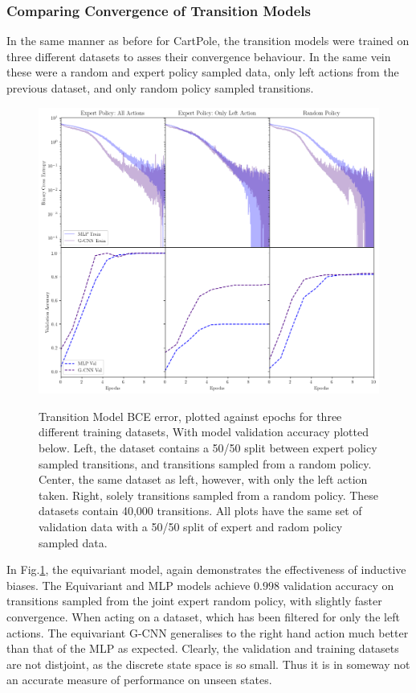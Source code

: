 \subsubsection{Comparing Convergence of Transition Models}
In the same manner as before for CartPole, the transition models were trained on three different datasets to asses their convergence behaviour. In the same vein these were a random and expert policy sampled data, only left actions from the previous dataset, and only random policy sampled transitions. 
\begin{figure}\label{fig:transition_model_catch}
	\centering
	\includegraphics[width=\linewidth]{Figures/transition_model_catch.png}
\label{fig:transition_model_catch}
\caption{Transition Model BCE error, plotted against epochs for three different training datasets, With model validation accuracy plotted below. Left, the dataset contains a 50/50 split between expert policy sampled transitions, and transitions sampled from a random policy. Center, the same dataset as left, however, with only the left action taken. Right, solely transitions sampled from a random policy. These datasets contain 40,000 transitions. All plots have the same set of validation data with a 50/50 split of expert and radom policy sampled data.}
\end{figure}
In Fig.\ref{fig:transition_model_catch}, the equivariant model, again demonstrates the effectiveness of inductive biases. The Equivariant and MLP models achieve $0.998$ validation accuracy on transitions sampled from the joint expert random policy, with slightly faster convergence. When acting on a dataset, which has been filtered for only the left actions. The equivariant G-CNN generalises to the right hand action much better than that of the MLP as expected. Clearly, the validation and training datasets are not distjoint, as the discrete state space is so small. Thus it is in someway not an accurate measure of performance on unseen states.

